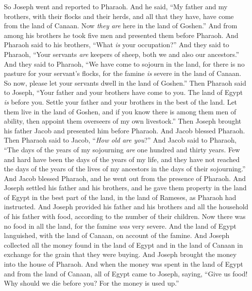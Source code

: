 \begin{biblechapter} %
 So Joseph went and reported to Pharaoh. And he said, “My father and my brothers, with their flocks and their herds, and all that they have, have come from the land of Canaan. Now \textit{they are} here in the land of Goshen.”
\verse And from among his brothers he took five men and presented them before Pharaoh.
\verse And Pharaoh said to his brothers, “What \textit{is} your occupation?” And they said to Pharaoh, “Your servants \textit{are} keepers of sheep, both we and also our ancestors.”
\verse And they said to Pharaoh, “We have come to sojourn in the land, for there is no pasture for your servant’s flocks, for the famine \textit{is} severe in the land of Canaan. So now, please let your servants dwell in the land of Goshen.”
\verse Then Pharaoh said to Joseph, “Your father and your brothers have come to you.
\verse The land of Egypt \textit{is} before you. Settle your father and your brothers in the best of the land. Let them live in the land of Goshen, and if you know there is among them men of ability, then appoint them overseers of my own livestock.”
\verse Then Joseph brought his father Jacob and presented him before Pharaoh. And Jacob blessed Pharaoh.
\verse Then Pharaoh said to Jacob, “\textit{How old are you}?”
\verse And Jacob said to Pharaoh, “The days of the years of my sojourning \textit{are} one hundred and thirty years. Few and hard have been the days of the years of my life, and they have not reached the days of the years of the lives of my ancestors in the days of their sojourning.”
\verse And Jacob blessed Pharaoh, and he went out from the presence of Pharaoh.
\verse And Joseph settled his father and his brothers, and he gave them property in the land of Egypt in the best part of the land, in the land of Rameses, as Pharaoh had instructed.
\verse And Joseph provided his father and his brothers and all the household of his father with food, according to the number of their children.
 Now there was no food in all the land, for the famine \textit{was} very severe. And the land of Egypt languished, with the land of Canaan, on account of the famine.
\verse And Joseph collected all the money found in the land of Egypt and in the land of Canaan in exchange for the grain that they were buying. And Joseph brought the money into the house of Pharaoh.
\verse And when the money was spent in the land of Egypt and from the land of Canaan, all of Egypt came to Joseph, saying, “Give us food! Why should we die before you? For the money is used up.”

\end{biblechapter}
